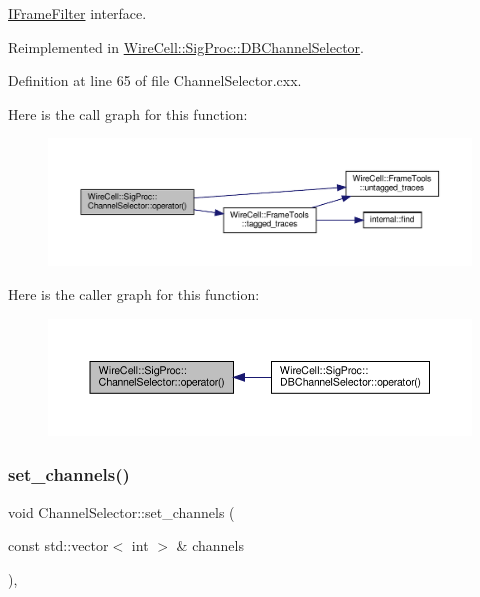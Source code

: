\hyperlink{class_wire_cell_1_1_i_frame_filter}{I\+Frame\+Filter} interface. 



Reimplemented in \hyperlink{class_wire_cell_1_1_sig_proc_1_1_d_b_channel_selector_aed483bbdb14a86719f307749becf7695}{Wire\+Cell\+::\+Sig\+Proc\+::\+D\+B\+Channel\+Selector}.



Definition at line 65 of file Channel\+Selector.\+cxx.

Here is the call graph for this function\+:
\nopagebreak
\begin{figure}[H]
\begin{center}
\leavevmode
\includegraphics[width=350pt]{class_wire_cell_1_1_sig_proc_1_1_channel_selector_aaca59eb8b7d47e29fed24f6976adc4f3_cgraph}
\end{center}
\end{figure}
Here is the caller graph for this function\+:
\nopagebreak
\begin{figure}[H]
\begin{center}
\leavevmode
\includegraphics[width=350pt]{class_wire_cell_1_1_sig_proc_1_1_channel_selector_aaca59eb8b7d47e29fed24f6976adc4f3_icgraph}
\end{center}
\end{figure}
\mbox{\label{class_wire_cell_1_1_sig_proc_1_1_channel_selector_a4f6162b720052e906073139e952769e5}} 
\subsubsection{\texorpdfstring{set\+\_\+channels()}{set\_channels()}}
{\footnotesize\ttfamily void Channel\+Selector\+::set\+\_\+channels (\begin{DoxyParamCaption}\item[{const std\+::vector$<$ int $>$ \&}]{channels }\end{DoxyParamCaption})\hspace{0.3cm}{\ttfamily [protected]}, {\ttfamily [virtual]}}



